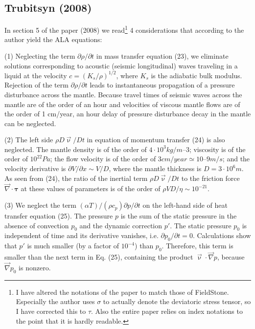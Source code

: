 \documentclass[a4paper,11pt]{article}
\begin{document}
\newpage
\subsection{Trubitsyn (2008)}

In section 5 of the paper \cite{trub08} (2008) we read\footnote{I have altered the notations 
of the paper to match those of FieldStone. Especially the author uses $\sigma$ to actually denote the 
deviatoric stress tensor, so I have corrected this to $\tau$. Also the entire paper relies on 
index notations to the point that it is hardly readable.} 4 considerations that according to the author yield the 
ALA equations:
\begin{displayquote}
{\color{darkgray}
(1)
Neglecting the term $\partial \rho/\partial t$ in mass transfer equation (23), 
we eliminate solutions corresponding to acoustic (seismic longitudinal) waves traveling in a 
liquid at the velocity $c = (K_s/\rho)^{1/2}$, where $K_s$ is the adiabatic
bulk modulus. Rejection of the term $\partial \rho/\partial t$ leads to instantaneous propagation of a pressure disturbance across the mantle. Because travel times of seismic
waves across the mantle are of the order of an hour and
velocities of viscous mantle flows are of the order of 1 cm/year, an hour delay of pressure disturbance decay
in the mantle can be neglected.

(2) 
The left side $\rho D\vec\upnu/Dt$  in 
equation of momentum transfer (24) is also neglected.
The mantle density is of the order of $4\cdot10^3 kg/m–3$; viscosity is of 
the order of $10^{22} Pa$; the flow velocity is of the order of $3 cm/year \simeq 10–9 m/s$; 
and the velocity derivative is $\partial V/\partial x \sim V/D$, where the mantle thickness is
$D = 3\cdot 10^6 m$. As seen from (24), the ratio of the inertial
term $\rho D\vec\upnu/Dt$ to the friction force $\vec\nabla\cdot {\bm \tau}$ at these 
values of parameters is of the order of $\rho VD/\eta \sim 10^{-21}$.

(3) 
We neglect the term $(\alpha T)/(\rho c_p) \partial p/\partial t$ on the left-hand 
side of heat transfer equation (25). The pressure $p$ is the sum of the static pressure in the absence of 
convection $p_0$ and the dynamic correction $p'$. The static pressure $p_0$ is independent of time and its derivative
vanishes, i.e. $\partial p_0/\partial t = 0$. Calculations show that $p'$ is much
smaller (by a factor of $10^{-4}$) than $p_0$. Therefore, this term is smaller than the next term in 
Eq. (25), containing the product $\vec\upnu\cdot\vec\nabla p$, because $\vec\nabla p_0$ is nonzero.

}
\end{displayquote}
\end{document}
